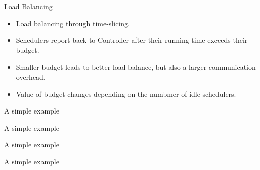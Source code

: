 \begin{frame} {Load Balancing}

\begin{itemize}[<+->]

\item Load balancing through time-slicing.

\item Schedulers report back to Controller after their running time exceeds their budget.

\item Smaller budget leads to better load balance, but also a larger communication overhead.

\item Value of budget changes depending on the numbmer of idle schedulers.


\end{itemize}

\end{frame}

\begin{frame}  {A simple example}
\end{frame}


\begin{frame}  {A simple example}
\end{frame}

\begin{frame}  {A simple example}
\end{frame}



\begin{frame}  {A simple example}
\end{frame}


\iffalse
\begin{frame} {Parallel optimal-DPOR - A first attempt}

While trying to parallelize optimal-DPOR following the same technique we encounter two main issues:

\begin{itemize}[<+->]
\item In the sequential optimal-DPOR calls to $Explore(E, Sleep, WuT)$ guarantee that the complete subtree rooted
at $E$ will be explored. However, for this to hold true,
all sequences in $wut(E)$ that were ordered before WuT must have been explored. This means that the concept of ownership cannot be applied to complete wakeup trees.
\item $insert_{[E]}(v,wut(E))$ may end up inserting at $wut(E)$ an execution sequence different than $v$ (but one that will lead to equivalent interleavings).
\end{itemize}

\end{frame}
\fi

